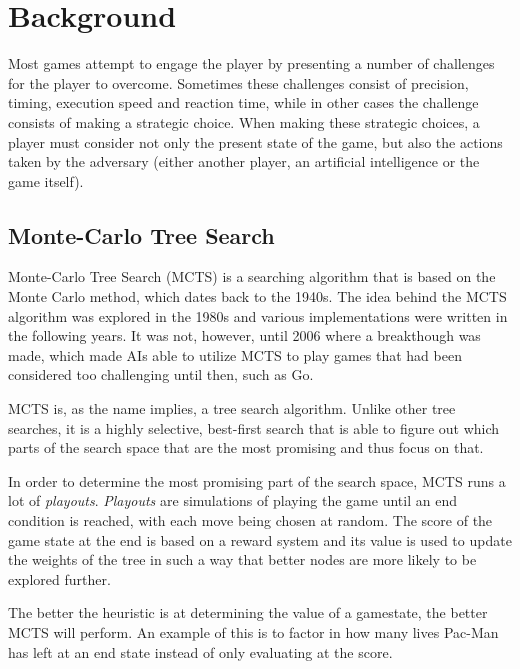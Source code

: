 \section{Background}
\label{02}
Most games attempt to engage the player by presenting a number of challenges for the player to overcome. Sometimes these challenges consist of precision, timing, execution speed and reaction time, while in other cases the challenge consists of making a strategic choice. When making these strategic choices, a player must consider not only the present state of the game, but also the actions taken by the adversary (either another player, an artificial intelligence or the game itself). 

\subsection{Monte-Carlo Tree Search}
\label{02_MCTS}

Monte-Carlo Tree Search\cite{browne2012survey} (MCTS) is a searching algorithm that is based on the Monte Carlo method, which dates back to the 1940s. The idea behind the MCTS algorithm was explored in the 1980s and various implementations were written in the following years. It was not, however, until 2006 where a breakthough was made, which made AIs able to utilize MCTS to play games that had been considered too challenging until then, such as Go\cite{gelly2011monte}\cite{chaslot2010monte}.

MCTS is, as the name implies, a tree search algorithm. Unlike other tree searches, it is a highly selective, best-first search that is able to figure out which parts of the search space that are the most promising and thus focus on that.

In order to determine the most promising part of the search space, MCTS runs a lot of \textit{playouts}. \textit{Playouts} are simulations of playing the game until an end condition is reached, with each move being chosen at random. The score of the game state at the end is based on a reward system and its value is used to update the weights of the tree in such a way that better nodes are more likely to be explored further.

The better the heuristic is at determining the value of a gamestate, the better MCTS will perform. An example of this is to factor in how many lives Pac-Man has left at an end state instead of only evaluating at the score.


